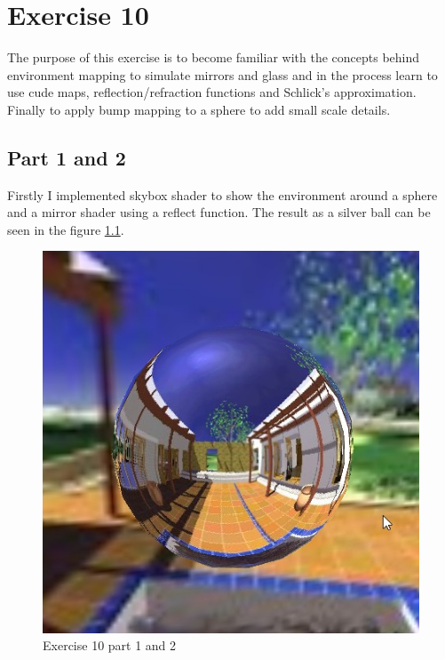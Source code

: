 \chapter{Exercise 10}
The purpose of this exercise is to become familiar with the concepts 
behind environment mapping to simulate mirrors and glass and in the 
process learn to use cude maps, reflection/refraction functions and 
Schlick's approximation. Finally to apply bump mapping to a sphere 
to add small scale details.

\section{Part 1 and 2}
Firstly I implemented skybox shader to show the environment around a sphere
and a mirror shader using a reflect function. The result as a silver ball
can be seen in the figure \ref{fig:exercise_10_1}.
\begin{figure}[ht!]
	\begin{center}
		\includegraphics[width=.65\textwidth]{figures/exercise_10_1}
	\end{center}
	\vspace{-4.5ex}\caption{Exercise 10 part 1 and 2}
	\label{fig:exercise_10_1} 
\end{figure}

